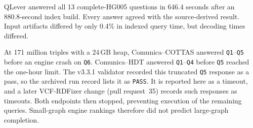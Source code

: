 \documentclass[11pt]{article}
\begin{document}
QLever answered all 13 complete-HG005 questions in 646.4 seconds after an 880.8-second index build.
Every answer agreed with the source-derived result.
Input artifacts differed by only 0.4\% in indexed query time, but decoding times differed.

At 171 million triples with a 24\,GB heap, Comunica--COTTAS answered \texttt{Q1}--\texttt{Q5} before an engine crash on \texttt{Q6}.
Comunica--HDT answered \texttt{Q1}--\texttt{Q4} before \texttt{Q5} reached the one-hour limit.
The v3.3.1 validator recorded this truncated \texttt{Q5} response as a pass, so the archived run record lists it as \texttt{PASS}.
It is reported here as a timeout, and a later VCF-RDFizer change (pull request~35) records such responses as timeouts.
Both endpoints then stopped, preventing execution of the remaining queries.
Small-graph engine rankings therefore did not predict large-graph completion.
\end{document}
